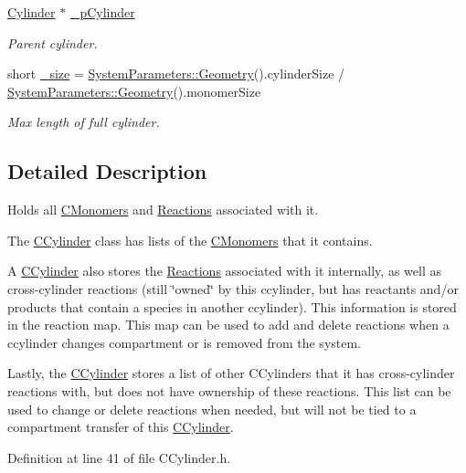 \begin{DoxyCompactItemize}
\hyperlink{classCylinder}{Cylinder} $\ast$ \hyperlink{classCCylinder_a4439d9b805e3e206fd495540aa975346}{\+\_\+p\+Cylinder}
\begin{DoxyCompactList}\small\item\em Parent cylinder. \end{DoxyCompactList}\item 
short \hyperlink{classCCylinder_a9951ded0fd9d228a2358bee18f8b61b6}{\+\_\+size} = \hyperlink{classSystemParameters_a9211bca7e3422c076f4e9ba2dc29c599}{System\+Parameters\+::\+Geometry}().cylinder\+Size / \hyperlink{classSystemParameters_a9211bca7e3422c076f4e9ba2dc29c599}{System\+Parameters\+::\+Geometry}().monomer\+Size
\begin{DoxyCompactList}\small\item\em Max length of full cylinder. \end{DoxyCompactList}\end{DoxyCompactItemize}


\subsection{Detailed Description}
Holds all \hyperlink{classCMonomer}{C\+Monomers} and \hyperlink{classReaction}{Reactions} associated with it. 

The \hyperlink{classCCylinder}{C\+Cylinder} class has lists of the \hyperlink{classCMonomer}{C\+Monomers} that it contains.

A \hyperlink{classCCylinder}{C\+Cylinder} also stores the \hyperlink{classReaction}{Reactions} associated with it internally, as well as cross-\/cylinder reactions (still \char`\"{}owned\char`\"{} by this ccylinder, but has reactants and/or products that contain a species in another ccylinder). This information is stored in the reaction map. This map can be used to add and delete reactions when a ccylinder changes compartment or is removed from the system.

Lastly, the \hyperlink{classCCylinder}{C\+Cylinder} stores a list of other C\+Cylinders that it has cross-\/cylinder reactions with, but does not have ownership of these reactions. This list can be used to change or delete reactions when needed, but will not be tied to a compartment transfer of this \hyperlink{classCCylinder}{C\+Cylinder}. 

Definition at line 41 of file C\+Cylinder.\+h.



